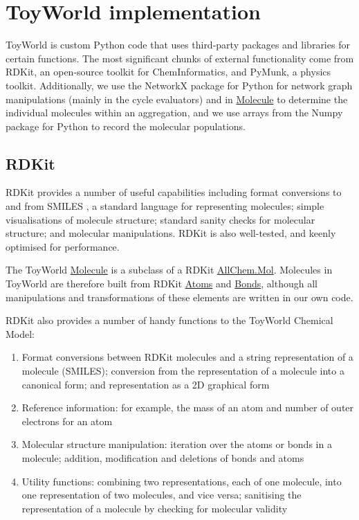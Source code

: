 \chapter{ToyWorld implementation}\label{toyworld-implementation}

ToyWorld is custom Python code that uses third-party packages and
libraries for certain functions. The most significant chunks of external
functionality come from RDKit, an open-source toolkit for
ChemInformatics, and PyMunk, a physics toolkit. Additionally, we use the
NetworkX package for Python for network graph manipulations (mainly in
the cycle evaluators) and in \url{Molecule} to determine the individual
molecules within an aggregation, and we use arrays from the Numpy
package for Python to record the molecular populations.

\section{RDKit}\label{rdkit}

RDKit provides a number of useful capabilities including format
conversions to and from SMILES \autocite{smiles}, a standard language
for representing molecules; simple visualisations of molecule structure;
standard sanity checks for molecular structure; and molecular
manipulations. RDKit is also well-tested, and keenly optimised for
performance.

The ToyWorld \url{Molecule} is a subclass of a RDKit \url{AllChem.Mol}.
Molecules in ToyWorld are therefore built from RDKit \url{Atoms} and
\url{Bonds}, although all manipulations and transformations of these
elements are written in our own code.

RDKit also provides a number of handy functions to the ToyWorld Chemical
Model:

\begin{enumerate}
\item
  Format conversions between RDKit molecules and a string representation
  of a molecule (SMILES); conversion from the representation of a
  molecule into a canonical form; and representation as a 2D graphical
  form
\item
  Reference information: for example, the mass of an atom and number of
  outer electrons for an atom
\item
  Molecular structure manipulation: iteration over the atoms or bonds in
  a molecule; addition, modification and deletions of bonds and atoms
\item
  Utility functions: combining two representations, each of one
  molecule, into one representation of two molecules, and vice versa;
  sanitising the representation of a molecule by checking for molecular
  validity
\end{enumerate}

